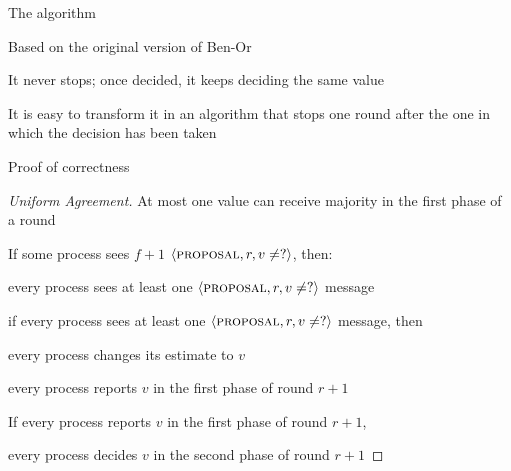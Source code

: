 \begin{frame}[shrink=20]{}

\begin{Procedure}	
\caption{Ben-Or's Algorithm executed by process $p_i$}
\BlankLine
{}
\end{Procedure}

\end{frame}

\begin{frame}{The algorithm}
\BIL
\item Based on the original version of Ben-Or
\item It never stops; once decided, it keeps deciding the same value
\item It is easy to transform it in an algorithm that stops one round after
the one in which the decision has been taken
\EIL
\end{frame}

\begin{frame}{Proof of correctness}
	
\begin{proof}[Uniform Agreement]
\BIL
\item At most one value can receive majority in the first phase of a round
\item If some process sees $f+1$ $\langle \textsc{proposal}, r, v \neq ? \rangle$, then:
\BI 
\item every process sees at least one $\langle \textsc{proposal}, r, v \neq ? \rangle$ message
\EI
\item if every process sees at least one $\langle \textsc{proposal}, r, v \neq ? \rangle$ message, then
\BI 
\item every process changes its estimate to $v$
\item every process reports $v$ in the first phase of round $r+1$
\EI
\item If every process reports $v$ in the first phase of round $r+1$,
\BI
\item every process decides $v$ in the second phase of round $r+1$
\EI
\EIL
\end{proof}

\end{frame}


